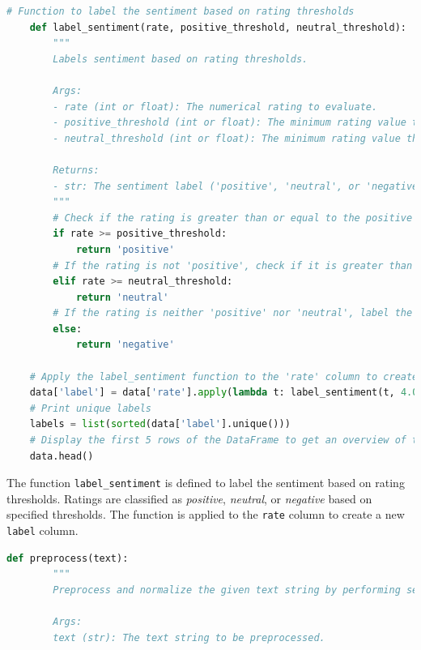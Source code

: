 \documentclass{solutionclass} %
\begin{document}
\begin{solution}
    \begin{lstlisting}[language=Python, basicstyle=\ttfamily\footnotesize, keywordstyle=\color{blue}, commentstyle=\color{gray}]
    # Function to label the sentiment based on rating thresholds
    def label_sentiment(rate, positive_threshold, neutral_threshold):
        """
        Labels sentiment based on rating thresholds.
    
        Args:
        - rate (int or float): The numerical rating to evaluate.
        - positive_threshold (int or float): The minimum rating value that qualifies as 'positive'.
        - neutral_threshold (int or float): The minimum rating value that qualifies as 'neutral'; ratings below this are considered 'negative'.
    
        Returns:
        - str: The sentiment label ('positive', 'neutral', or 'negative') based on the rating.
        """
        # Check if the rating is greater than or equal to the positive threshold
        if rate >= positive_threshold:
            return 'positive'
        # If the rating is not 'positive', check if it is greater than or equal to the neutral threshold
        elif rate >= neutral_threshold:
            return 'neutral'
        # If the rating is neither 'positive' nor 'neutral', label the sentiment as 'negative'
        else:
            return 'negative'
        
    # Apply the label_sentiment function to the 'rate' column to create a new 'label' column
    data['label'] = data['rate'].apply(lambda t: label_sentiment(t, 4.0, 2.0))
    # Print unique labels
    labels = list(sorted(data['label'].unique()))
    # Display the first 5 rows of the DataFrame to get an overview of the data
    data.head()
    \end{lstlisting}
    
    The function \texttt{label\_sentiment} is defined to label the sentiment based on rating thresholds. Ratings are classified as \textit{positive}, \textit{neutral}, or \textit{negative} based on specified thresholds. The function is applied to the \texttt{rate} column to create a new \texttt{label} column.
    
    \begin{lstlisting}[language=Python, basicstyle=\ttfamily\footnotesize, keywordstyle=\color{blue}, commentstyle=\color{gray}]
    def preprocess(text):
        """
        Preprocess and normalize the given text string by performing several transformations.
        
        Args:
        text (str): The text string to be preprocessed.
        

\end{lstlisting}
\end{solution}
\end{document}
